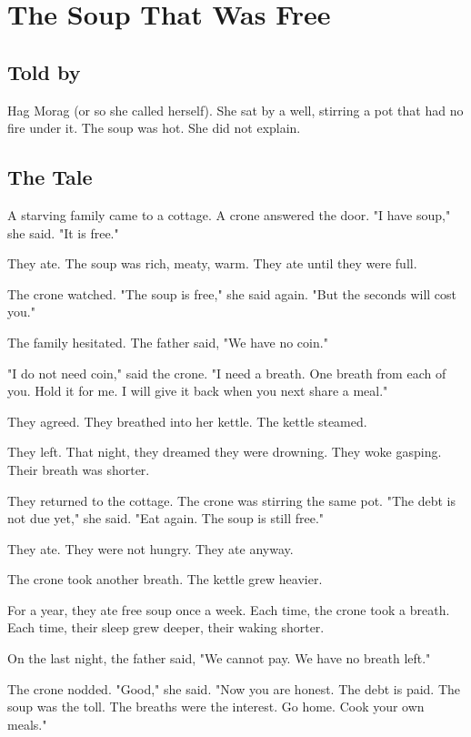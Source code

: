 \chapter{The Soup That Was Free}

\section*{Told by}
Hag Morag (or so she called herself). She sat by a well, stirring a pot that had no fire under it. The soup was hot. She did not explain.

\section*{The Tale}

A starving family came to a cottage. A crone answered the door. "I have soup," she said. "It is free."

They ate. The soup was rich, meaty, warm. They ate until they were full.

The crone watched. "The soup is free," she said again. "But the seconds will cost you."

The family hesitated. The father said, "We have no coin."

"I do not need coin," said the crone. "I need a breath. One breath from each of you. Hold it for me. I will give it back when you next share a meal."

They agreed. They breathed into her kettle. The kettle steamed.

They left. That night, they dreamed they were drowning. They woke gasping. Their breath was shorter.

They returned to the cottage. The crone was stirring the same pot. "The debt is not due yet," she said. "Eat again. The soup is still free."

They ate. They were not hungry. They ate anyway.

The crone took another breath. The kettle grew heavier.

For a year, they ate free soup once a week. Each time, the crone took a breath. Each time, their sleep grew deeper, their waking shorter.

On the last night, the father said, "We cannot pay. We have no breath left."

The crone nodded. "Good," she said. "Now you are honest. The debt is paid. The soup was the toll. The breaths were the interest. Go home. Cook your own meals."

